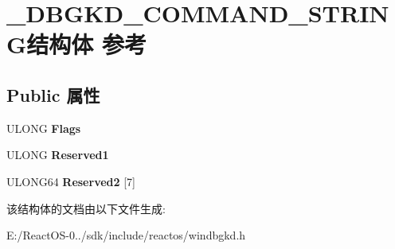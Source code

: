 \hypertarget{struct___d_b_g_k_d___c_o_m_m_a_n_d___s_t_r_i_n_g}{}\section{\+\_\+\+D\+B\+G\+K\+D\+\_\+\+C\+O\+M\+M\+A\+N\+D\+\_\+\+S\+T\+R\+I\+N\+G结构体 参考}
\label{struct___d_b_g_k_d___c_o_m_m_a_n_d___s_t_r_i_n_g}
\subsection*{Public 属性}
\begin{DoxyCompactItemize}
\item 
\mbox{\label{struct___d_b_g_k_d___c_o_m_m_a_n_d___s_t_r_i_n_g_afb789cf5b830a2291d6b94bd09bf6906}} 
U\+L\+O\+NG {\bfseries Flags}
\item 
\mbox{\label{struct___d_b_g_k_d___c_o_m_m_a_n_d___s_t_r_i_n_g_a3eb2b87bd79fab599fb9ff83b0daa58d}} 
U\+L\+O\+NG {\bfseries Reserved1}
\item 
\mbox{\label{struct___d_b_g_k_d___c_o_m_m_a_n_d___s_t_r_i_n_g_adc831b47429b5d18a91c905d4b6a0986}} 
U\+L\+O\+N\+G64 {\bfseries Reserved2} \mbox{[}7\mbox{]}
\end{DoxyCompactItemize}


该结构体的文档由以下文件生成\+:\begin{DoxyCompactItemize}
\item 
E\+:/\+React\+O\+S-\/0../sdk/include/reactos/windbgkd.\+h\end{DoxyCompactItemize}
